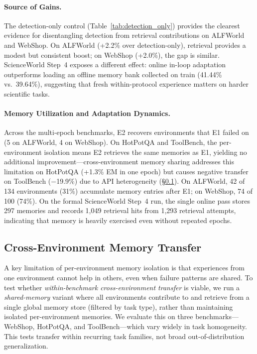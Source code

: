 \paragraph{Source of Gains.} The detection-only control (Table~\ref{tab:detection_only}) provides the clearest evidence for disentangling detection from retrieval contributions on ALFWorld and WebShop. On ALFWorld (+2.2\% over detection-only), retrieval provides a modest but consistent boost; on WebShop (+2.0\%), the gap is similar. ScienceWorld Step~4 exposes a different effect: online in-loop adaptation outperforms loading an offline memory bank collected on train (41.44\% vs.\ 39.64\%), suggesting that fresh within-protocol experience matters on harder scientific tasks.

\paragraph{Memory Utilization and Adaptation Dynamics.} Across the multi-epoch benchmarks, E2 recovers environments that E1 failed on (5 on ALFWorld, 4 on WebShop). On HotPotQA and ToolBench, the per-environment isolation means E2 retrieves the same memories as E1, yielding no additional improvement---cross-environment memory sharing addresses this limitation on HotPotQA (+1.3\% EM in one epoch) but causes negative transfer on ToolBench ($-$19.9\%) due to API heterogeneity (\S\ref{sec:cross_env}). On ALFWorld, 42 of 134 environments (31\%) accumulate memory entries after E1; on WebShop, 74 of 100 (74\%). On the formal ScienceWorld Step~4 run, the single online pass stores 297 memories and records 1,049 retrieval hits from 1,293 retrieval attempts, indicating that memory is heavily exercised even without repeated epochs.

\subsection{Cross-Environment Memory Transfer}
\label{sec:cross_env}

A key limitation of per-environment memory isolation is that experiences from one environment cannot help in others, even when failure patterns are shared. To test whether \emph{within-benchmark cross-environment transfer} is viable, we run a \emph{shared-memory} variant where all environments contribute to and retrieve from a single global memory store (filtered by task type), rather than maintaining isolated per-environment memories. We evaluate this on three benchmarks---WebShop, HotPotQA, and ToolBench---which vary widely in task homogeneity. This tests transfer within recurring task families, not broad out-of-distribution generalization.

